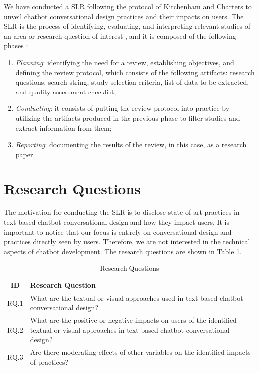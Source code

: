 We have conducted a \acrfull{SLR} following the protocol of Kitchenham and Charters \cite{barbara2007guidelines} to unveil chatbot conversational design practices and their impacts on users. The \acrshort{SLR} is the process of identifying, evaluating, and interpreting relevant studies of an area or research question of interest \cite{kitchenham2004procedures}, and it is composed of the following phases \cite{barbara2007guidelines}: 

\begin{enumerate}
    \item \textit{Planning}: identifying the need for a review, establishing objectives, and defining the review protocol, which consists of the following artifacts: research questions, search string, study selection criteria, list of data to be extracted, and quality assessment checklist;
    
    \item \textit{Conducting}: it consists of putting the review protocol into practice by utilizing the artifacts produced in the previous phase to filter studies and extract information from them;
    
    \item \textit{Reporting}: documenting the results of the review, in this case, as a research paper.
\end{enumerate}

\section{Research Questions}
 
The motivation for conducting the \acrshort{SLR} is to disclose state-of-art practices in text-based chatbot conversational design and how they impact users. It is important to notice that our focus is entirely on conversational design and practices directly seen by users. Therefore, we are not interested in the technical aspects of chatbot development. The research questions are shown in Table \ref{tab:research_questions}.

\begin{table}[htb!]
  \centering
  \caption{Research Questions}
  \label{tab:research_questions}
  \begin{tabular}{cp{13cm}}
    \hline
    ID & Research Question \\
    \hline
    RQ.1 & What are the textual or visual approaches used in text-based chatbot conversational design?  \\
    RQ.2 & What are the positive or negative impacts on users of the identified textual or visual approaches in text-based chatbot conversational design?  \\
    RQ.3 & Are there moderating effects of other variables on the identified impacts of practices? \\
  \hline
\end{tabular}
\end{table}

